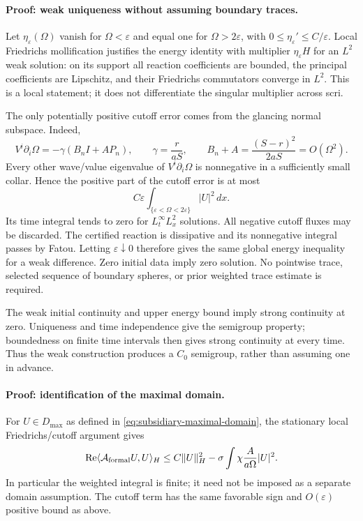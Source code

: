 \paragraph{Proof: weak uniqueness without assuming boundary traces.}
Let $\eta_\varepsilon(\Omega)$ vanish for $\Omega<\varepsilon$ and equal one
for $\Omega>2\varepsilon$, with
$0\le\eta_\varepsilon'\le C/\varepsilon$. Local Friedrichs mollification
justifies the energy identity with multiplier $\eta_\varepsilon H$ for an
$L^2$ weak solution: on its support all reaction coefficients are bounded,
the principal coefficients are Lipschitz, and their Friedrichs commutators
converge in $L^2$. This is a local statement; it does not differentiate the
singular multiplier across scri.

The only potentially positive cutoff error comes from the glancing normal
subspace. Indeed,
\[
 V^i\partial_i\Omega=-\gamma(B_nI+AP_n),\qquad
 \gamma=\frac r{aS},\qquad
 B_n+A=\frac{(S-r)^2}{2aS}=O(\Omega^2).
\]
Every other wave/value eigenvalue of $V^i\partial_i\Omega$ is nonnegative
in a sufficiently small collar. Hence the positive part of the cutoff error
is at most
\[
 C\varepsilon\int_{\{\varepsilon<\Omega<2\varepsilon\}}|U|^2\,dx.
\]
Its time integral tends to zero for $L^\infty_tL^2_x$ solutions. All negative
cutoff fluxes may be discarded. The certified reaction is dissipative and
its nonnegative integral passes by Fatou. Letting $\varepsilon\downarrow0$
therefore gives the same global energy inequality for a weak difference.
Zero initial data imply zero solution. No pointwise trace, selected sequence
of boundary spheres, or prior weighted trace estimate is required.

The weak initial continuity and upper energy bound imply strong continuity
at zero. Uniqueness and time independence give the semigroup property;
boundedness on finite time intervals then gives strong continuity at every
time. Thus the weak construction produces a $C_0$ semigroup, rather than
assuming one in advance.

\paragraph{Proof: identification of the maximal domain.}
For $U\in D_{\max}$ as defined in \eqref{eq:subsidiary-maximal-domain}, the
stationary local Friedrichs/cutoff argument gives
\begin{equation}
 \operatorname{Re}\langle\mathcal A_{\rm formal}U,U\rangle_H
 \le C\|U\|_H^2-
 \sigma\int\chi\frac A{a\Omega}|U|^2 .
 \label{eq:subsidiary-stationary-domain-energy}
\end{equation}
In particular the weighted integral is finite; it need not be imposed as a
separate domain assumption. The cutoff term has the same favorable sign
and $O(\varepsilon)$ positive bound as above.


